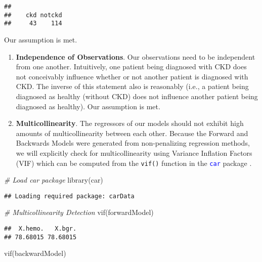 \documentclass[
]{article}
\newenvironment{Shaded}{\begin{snugshade}}{\end{snugshade}}
\newcommand{\CommentTok}[1]{\textcolor[rgb]{0.56,0.35,0.01}{\textit{#1}}}
\newcommand{\FunctionTok}[1]{\textcolor[rgb]{0.00,0.00,0.00}{#1}}
\newcommand{\NormalTok}[1]{#1}
\begin{document}
\begin{verbatim}
## 
##    ckd notckd 
##     43    114
\end{verbatim}

Our assumption is met.

\begin{enumerate}
\def\labelenumi{\arabic{enumi}.}
\setcounter{enumi}{1}
\item
  \textbf{Independence of Observations}. Our observations need to be
  independent from one another. Intuitively, one patient being diagnosed
  with CKD does not conceivably influence whether or not another patient
  is diagnosed with CKD. The inverse of this statement also is
  reasonably (i.e., a patient being diagnosed as healthy (without CKD)
  does not influence another patient being diagnosed as healthy). Our
  assumption is met.
\item
  \textbf{Multicollinearity}. The regressors of our models should not
  exhibit high amounts of multicollinearity between each other. Because
  the Forward and Backwards Models were generated from non-penalizing
  regression methods, we will explicitly check for multicollinearity
  using Variance Inflation Factors (VIF) which can be computed from the
  \texttt{vif()} function in the \textcolor{blue}{\texttt{car}} package
  \autocite{Fox2019}.
\end{enumerate}

\begin{Shaded}
\begin{Highlighting}[]
\CommentTok{\# Load car package}
\FunctionTok{library}\NormalTok{(car)}
\end{Highlighting}
\end{Shaded}

\begin{verbatim}
## Loading required package: carData
\end{verbatim}

\begin{Shaded}
\begin{Highlighting}[]
\CommentTok{\# Multicollinearity Detection}
\FunctionTok{vif}\NormalTok{(forwardModel)}
\end{Highlighting}
\end{Shaded}

\begin{verbatim}
##  X.hemo.   X.bgr. 
## 78.68015 78.68015
\end{verbatim}

\begin{Shaded}
\begin{Highlighting}[]
\FunctionTok{vif}\NormalTok{(backwardModel)}
\end{Highlighting}
\end{Shaded}
\end{document}

